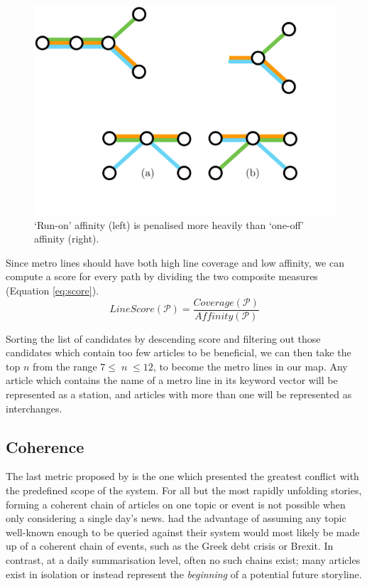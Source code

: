\begin{figure}[htbp!]
	\centering
	\includegraphics[width=.8\textwidth]{img/implementation/abcaffinity.pdf}
	\caption{`Run-on' affinity (left) is penalised more heavily than `one-off' affinity (right).}
	\label{fig:abcaffinity}
\end{figure}

Since metro lines should have both high line coverage and low affinity, we can compute a score for every path by dividing the two composite measures (Equation \ref{eq:score}).
\begin{equation}
	LineScore(\mathcal{P}) = \frac{Coverage(\mathcal{P})}{Affinity(\mathcal{P})}
	\label{eq:score}
\end{equation}

Sorting the list of candidates by descending score and filtering out those candidates which contain too few articles to be beneficial, we can then take the top $n$ from the range $7 \leq\;n\;\leq 12$, to become the metro lines in our map. Any article which contains the name of a metro line in its keyword vector will be represented as a station, and articles with more than one will be represented as interchanges.

\subsection{Coherence}
The last metric proposed by \citeauthor{GeneratingInformationMaps} is the one which presented the greatest conflict with the predefined scope of the system. For all but the most rapidly unfolding stories, forming a coherent chain of articles on one topic or event is not possible when only considering a single day's news. \citeauthor{GeneratingInformationMaps} had the advantage of assuming any topic well-known enough to be queried against their system would most likely be made up of a coherent chain of events, such as the Greek debt crisis or Brexit. In contrast, at a daily summarisation level, often no such chains exist; many articles exist in isolation or instead represent the \textit{beginning} of a potential future storyline. 

